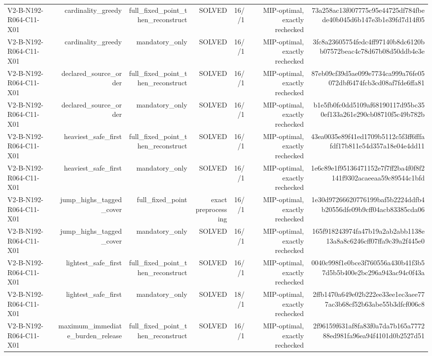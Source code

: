 {\begin{longtable}{lrrrrrr}
V2-B-N192-R064-C11-X01 & cardinality\_greedy & full\_fixed\_point\_then\_reconstruct & SOLVED & 16//1 & MIP-optimal, exactly rechecked & 73a258ac13f007775c95e44725df784fbede40b045d6b147e3b1e39fd7d14f05 \\
V2-B-N192-R064-C11-X01 & cardinality\_greedy & mandatory\_only & SOLVED & 16//1 & MIP-optimal, exactly rechecked & 3fc8a23605754fedc4ff97140b8dc6120bb07572beac4c78d67b08d50ddb4e3e \\
V2-B-N192-R064-C11-X01 & declared\_source\_order & full\_fixed\_point\_then\_reconstruct & SOLVED & 16//1 & MIP-optimal, exactly rechecked & 87eb09cf39d5ae099e7734ca999a76fe05072dbf6474fcb3cd08af7fde6ffa81 \\
V2-B-N192-R064-C11-X01 & declared\_source\_order & mandatory\_only & SOLVED & 16//1 & MIP-optimal, exactly rechecked & b1e5fb0fc0dd5109af68190117d95bc350ef133a261e290cb08710f5c49b782b \\
V2-B-N192-R064-C11-X01 & heaviest\_safe\_first & full\_fixed\_point\_then\_reconstruct & SOLVED & 16//1 & MIP-optimal, exactly rechecked & 43ea0035e89f41ed1709b5112c5f3ff6fffafdf17b811e54d357a18e04e4dd11 \\
V2-B-N192-R064-C11-X01 & heaviest\_safe\_first & mandatory\_only & SOLVED & 16//1 & MIP-optimal, exactly rechecked & 1e6c89e1f95136471152e7f7ff2ba4f0f8f2141f9302acaeeaa59c89544c1bfd \\
V2-B-N192-R064-C11-X01 & jump\_highs\_tagged\_cover & full\_fixed\_point & exact preprocessing & 16//1 & MIP-optimal, exactly rechecked & 1e30d97266620776199baf5b2224ddfb4b20556dfe09b9cff04acb83385cda06 \\
V2-B-N192-R064-C11-X01 & jump\_highs\_tagged\_cover & mandatory\_only & SOLVED & 16//1 & MIP-optimal, exactly rechecked & 165f918243974fa47b19a2ab2abb1138e13a8a8c6246cff07ffa9c39a2f445e0 \\
V2-B-N192-R064-C11-X01 & lightest\_safe\_first & full\_fixed\_point\_then\_reconstruct & SOLVED & 16//1 & MIP-optimal, exactly rechecked & 0040c998f1e0bce3f760556a430b41f3b57d5b5b400e2bc296a943ac94c0f43a \\
V2-B-N192-R064-C11-X01 & lightest\_safe\_first & mandatory\_only & SOLVED & 18//1 & MIP-optimal, exactly rechecked & 2ffb1470a649e02b222ee33ee1ec3aee777ac3b68cf52b63abe55b3dfcf006c8 \\
V2-B-N192-R064-C11-X01 & maximum\_immediate\_burden\_release & full\_fixed\_point\_then\_reconstruct & SOLVED & 16//1 & MIP-optimal, exactly rechecked & 2f96159f631af8fa83f0a7da7b165a777288ed981fa96ea94f4101d0b2527d51 \\

\end{longtable}}
